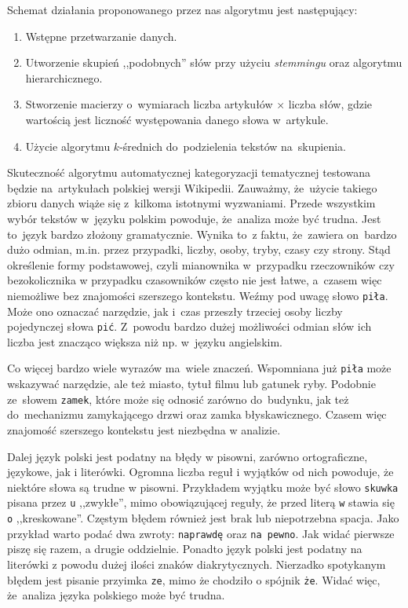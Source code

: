 \documentclass{praca1}
\begin{document}
Schemat działania proponowanego przez nas algorytmu jest następujący:
\begin{enumerate}
\item Wstępne przetwarzanie danych.
\item Utworzenie skupień ,,podobnych'' słów przy użyciu \emph{stemmingu} oraz algorytmu hierarchicznego.
\item Stworzenie macierzy o~wymiarach liczba artykułów $\times$ liczba słów, gdzie wartością jest liczność występowania danego słowa w~artykule.
\item Użycie algorytmu $k$-średnich do~podzielenia tekstów na~skupienia.
\end{enumerate}

Skuteczność algorytmu automatycznej kategoryzacji tematycznej testowana będzie na~artykułach polskiej wersji Wikipedii. Zauważmy, że~użycie takiego zbioru danych wiąże się z~kilkoma istotnymi wyzwaniami. Przede wszystkim wybór tekstów w~języku polskim powoduje, że~analiza może być trudna. Jest to~język bardzo złożony gramatycznie. Wynika to~z faktu, że~zawiera on~bardzo dużo odmian, m.in. przez przypadki, liczby, osoby, tryby, czasy czy strony. Stąd określenie formy podstawowej, czyli mianownika w~przypadku rzeczowników czy bezokolicznika w przypadku czasowników często nie jest łatwe, a~czasem więc niemożliwe bez znajomości szerszego kontekstu. Weźmy pod uwagę słowo \verb|piła|. Może ono oznaczać narzędzie, jak i~czas przeszły trzeciej osoby liczby pojedynczej słowa \verb|pić|. Z~powodu bardzo dużej możliwości odmian słów ich liczba jest znacząco większa niż np. w~języku angielskim. 

Co więcej bardzo wiele wyrazów ma~wiele znaczeń. Wspomniana już \verb|piła| może wskazywać narzędzie, ale też miasto, tytuł filmu lub gatunek ryby. Podobnie ze~słowem \verb|zamek|, które może się odnosić zarówno do~budynku, jak też do~mechanizmu zamykającego drzwi oraz zamka błyskawicznego. Czasem więc znajomość szerszego kontekstu jest niezbędna w analizie.

Dalej język polski jest podatny na błędy w pisowni, zarówno ortograficzne, językowe, jak i literówki. Ogromna liczba reguł i wyjątków od nich powoduje, że niektóre słowa są trudne w pisowni. Przykładem wyjątku może być słowo \verb|skuwka| pisana przez \verb|u| ,,zwykłe'', mimo obowiązującej reguły, że przed literą \verb|w| stawia się \verb|o| ,,kreskowane''. Częstym błędem również jest brak lub niepotrzebna spacja. Jako przykład warto podać dwa zwroty: \verb|naprawdę| oraz \verb|na pewno|. Jak widać pierwsze piszę się razem, a drugie oddzielnie. Ponadto język polski jest podatny na literówki z powodu dużej ilości znaków diakrytycznych. Nierzadko spotykanym błędem jest pisanie przyimka \verb|ze|, mimo że chodziło o spójnik \verb|że|. Widać więc, że~analiza języka polskiego może być trudna.
\end{document}
